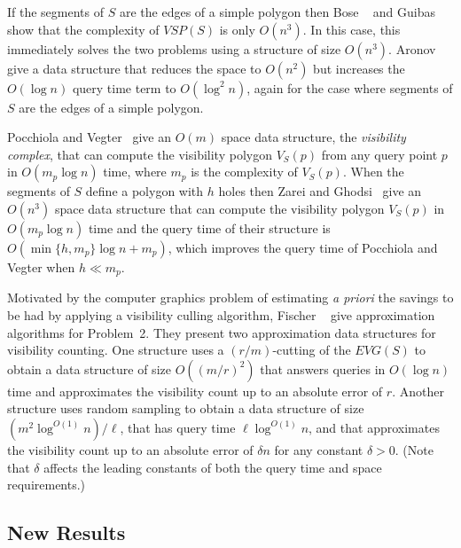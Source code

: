 \documentclass{patmorin}
\newcommand{\EVG}{\mathit{EVG}}
\newcommand{\VSP}{\mathit{VSP}}
\begin{document}

If the segments of $S$ are the edges of a simple polygon then Bose \etal\
\cite{blm02} and Guibas \etal\ \cite{gmr97} show that the complexity of
$\VSP(S)$ is only $O(n^3)$.  In this case, this immediately solves the
two problems using a structure of size $O(n^3)$.  Aronov \etal\
\cite{agtz02} give a data structure that reduces the space to $O(n^2)$
but increases the $O(\log n)$ query time term to $O(\log^2 n)$, again
for the case where segments of $S$ are the edges of a simple polygon.

Pocchiola and Vegter~\cite{pv96} give an $O(m)$ space data structure,
the \emph{visibility complex}, that can compute the visibility
polygon $V_S(p)$ from any query point $p$ in $O(m_p \log n)$ time, where
$m_p$ is the complexity of $V_S(p)$. When the segments of
$S$ define a polygon with $h$ holes then Zarei and Ghodsi~\cite{zg-ecqpv-05}
give an $O(n^3)$ space data structure that can compute the visibility
polygon $V_S(p)$ in $O(m_p \log n)$ time and the query time of their
structure is $O(\min\{h, m_p\} \log n+m_p)$, which improves the query
time of Pocchiola and Vegter when $h \ll m_p$.

Motivated by the computer graphics problem of estimating \emph{a priori}
the savings to be had by applying a visibility culling algorithm,
Fischer \etal\ \cite{fhjmz08,fhjmz09} give approximation algorithms for
Problem~2.  They present two approximation data structures for visibility
counting. One structure uses a $(r/m)$-cutting \cite[Section~4.5]{m02}
of the $\EVG(S)$ to obtain a data structure of size $O((m/r)^2)$ that answers
queries in $O(\log n)$ time and approximates the visibility count up to
an absolute error of $r$.  Another structure uses random sampling to
obtain a data structure of size $(m^2\log^{O(1)} n)/\ell$, that has query
time $\ell\log^{O(1)} n$, and that approximates the visibility count up to
an absolute error of $\delta n$ for any constant $\delta > 0$.  (Note that
$\delta$ affects the leading constants of both the query time and space
requirements.)

\subsection{New Results}
\end{document}
